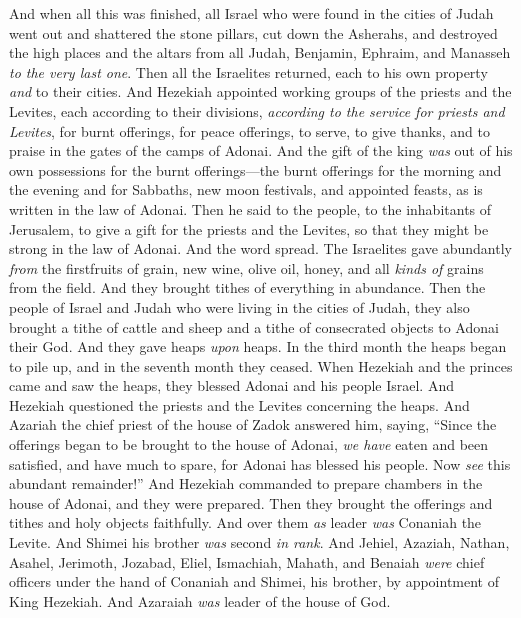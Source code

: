 \begin{biblechapter} %
 And when all this was finished, all Israel who were found in the cities of Judah went out and shattered the stone pillars, cut down the Asherahs, and destroyed the high places and the altars from all Judah, Benjamin, Ephraim, and Manasseh \textit{to the very last one}. Then all the Israelites returned, each to his own property \textit{and} to their cities.
\verse And Hezekiah appointed working groups of the priests and the Levites, each according to their divisions, \textit{according to the service for priests and Levites}, for burnt offerings, for peace offerings, to serve, to give thanks, and to praise in the gates of the camps of Adonai.
\verse And the gift of the king \textit{was} out of his own possessions for the burnt offerings—the burnt offerings for the morning and the evening and for Sabbaths, new moon festivals, and appointed feasts, as is written in the law of Adonai.
\verse Then he said to the people, to the inhabitants of Jerusalem, to give a gift for the priests and the Levites, so that they might be strong in the law of Adonai.
\verse And the word spread. The Israelites gave abundantly \textit{from} the firstfruits of grain, new wine, olive oil, honey, and all \textit{kinds of} grains from the field. And they brought tithes of everything in abundance.
\verse Then the people of Israel and Judah who were living in the cities of Judah, they also brought a tithe of cattle and sheep and a tithe of consecrated objects to Adonai their God. And they gave heaps \textit{upon} heaps.
\verse In the third month the heaps began to pile up, and in the seventh month they ceased.
\verse When Hezekiah and the princes came and saw the heaps, they blessed Adonai and his people Israel.
\verse And Hezekiah questioned the priests and the Levites concerning the heaps.
\verse And Azariah the chief priest of the house of Zadok answered him, saying, “Since the offerings began to be brought to the house of Adonai, \textit{we have} eaten and been satisfied, and have much to spare, for Adonai has blessed his people. Now \textit{see} this abundant remainder!”
\verse And Hezekiah commanded to prepare chambers in the house of Adonai, and they were prepared.
\verse Then they brought the offerings and tithes and holy objects faithfully. And over them \textit{as} leader \textit{was} Conaniah the Levite. And Shimei his brother \textit{was} second \textit{in rank}.
\verse And Jehiel, Azaziah, Nathan, Asahel, Jerimoth, Jozabad, Eliel, Ismachiah, Mahath, and Benaiah \textit{were} chief officers under the hand of Conaniah and Shimei, his brother, by appointment of King Hezekiah. And Azaraiah \textit{was} leader of the house of God.

\end{biblechapter}
